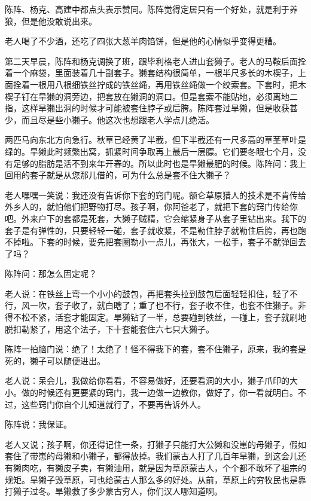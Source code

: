 \par 陈阵、杨克、高建中都点头表示赞同。陈阵觉得定居只有一个好处，就是利于养狼，但是他没敢说出来。
\par 老人喝了不少酒，还吃了四张大葱羊肉馅饼，但是他的心情似乎变得更糟。
\par 
\par 第二天早晨，陈阵和杨克调换了班，跟毕利格老人进山套獭子。老人的马鞍后面拴着一个麻袋，里面装着几十副套子。獭套结构很简单，一根半尺多长的木楔子，上面拴着一根用八根细铁丝拧成的铁丝绳，再用铁丝绳做一个绞索套。下套时，把木楔子钉在旱獭的洞旁边，把套放在獭洞的洞口。但是套索不能贴地，必须离地二指，这样旱獭出洞的时候才可能被套住脖子或后胯。陈阵套过旱獭，但是收获甚少，而且尽是些小獭子。他这次也想跟老人学点儿绝活。
\par 两匹马向东北方向急行。秋草已经黄了半截，但下半截还有一尺多高的草茎草叶是绿的。旱獭此时频繁出窝，抓紧时间争取再上最后一层膘。它们要冬眠七个月，没有足够的脂肪是活不到来年开春的。所以此时也是旱獭最肥的时候。陈阵问：我上回用的套子就是从您那儿借的，可为什么总是套不住大獭子？
\par 老人嘿嘿一笑说：我还没有告诉你下套的窍门呢。额仑草原猎人的技术是不肯传给外乡人的，就怕他们把野物打尽。孩子啊，你阿爸老了，就把下套的窍门传给你吧。外来户下的套都是死套，大獭子贼精，它会缩紧身子从套子里钻出来。我下的套子是有弹性的，只要轻轻一碰，套子就收紧，不是勒住脖子就勒住后胯，再也跑不掉啦。下套的时候，要先把套圈勒小一点儿，再张大，一松手，套子不就弹回去了吗？
\par 陈阵问：那怎么固定呢？
\par 老人说：在铁丝上弯一个小小的鼓包，再把套头拉到鼓包后面轻轻扣住，轻了不行，风一吹，套子收了，就白瞎了；重了也不行，套子收不住，也套不住獭子。非得不松不紧，活套才能固定。旱獭钻了一半，总要碰到铁丝，一碰上，套子就刷地脱扣勒紧了，用这个法子，下十套能套住六七只大獭子。
\par 陈阵一拍脑门说：绝了！太绝了！怪不得我下的套，套不住獭子，原来，我的套是死的，獭子可以随便进出。
\par 老人说：呆会儿，我做给你看看，不容易做好，还要看洞的大小，獭子爪印的大小。做的时候还有更要紧的窍门，我一边做一边教你，做好了，你一看就明白。不过，这些窍门你自个儿知道就行了，不要再告诉外人。
\par 陈阵说：我保证。
\par 老人又说；孩子啊，你还得记住一条，打獭子只能打大公獭和没崽的母獭子，假如套住了带崽的母獭和小獭子，都得放掉。我们蒙古人打了几百年旱獭，到这会儿还有獭肉吃，有獭皮子卖，有獭油用，就是因为草原蒙古人，个个都不敢坏了祖宗的规矩。旱獭子毁草原，可也给蒙古人那么多的好处。从前，草原上的穷牧民也是靠打獭子过冬。旱獭救了多少蒙古穷人，你们汉人哪知道啊。
